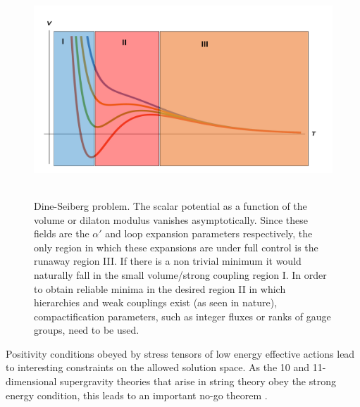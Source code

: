 \begin{figure}[t]
\begin{center}
\includegraphics[width=120mm,height=80mm]{Sections/Figures/DineSeiberg.pdf} 
\caption{Dine-Seiberg problem. The scalar potential as a function of the volume or dilaton modulus vanishes asymptotically. Since these fields are the $\alpha'$ and loop expansion parameters respectively, the only region in which these expansions are under full control is the runaway region III. If there is a non trivial minimum it would naturally fall in the small volume/strong coupling region I. In order to obtain reliable minima in the desired region II in which hierarchies  and weak couplings exist (as seen in nature),  compactification parameters, such as integer fluxes or ranks of gauge groups, need to be used.} \label{Fig:CY} 
\end{center}
\end{figure}


  Positivity conditions obeyed by stress 
tensors of low energy effective actions lead to interesting constraints on the allowed solution space. As the 10 and 11-dimensional
supergravity theories that arise in string theory obey the strong energy condition, this leads to an important no-go theorem \cite{Gibbons:1984kp, deWit:1986mwo, Maldacena:2000mw}.

